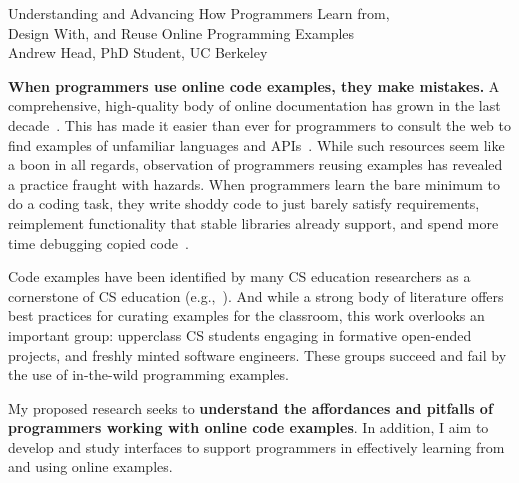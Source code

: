 \documentclass[12pt]{memoir}
\title{}
\author{Andrew Head}
\begin{document}
\begin{center}
Understanding and Advancing How Programmers Learn from,\\ Design With, and Reuse Online Programming Examples\\
\vspace{1ex}
Andrew Head, PhD Student, UC Berkeley
\end{center}
\vspace{-1em}


\textbf{When programmers use online code examples, they make mistakes.}
A comprehensive, high-quality body of online documentation has grown in the last decade~\cite{parnin_crowd_2012,mamykina_design_2011}.
This has made it easier than ever for programmers to consult the web to find examples of unfamiliar languages and APIs~\cite{brandt_two_2009}.
While such resources seem like a boon in all regards, observation of programmers reusing examples has revealed a practice fraught with hazards.
When programmers learn the bare minimum to do a coding task, they write shoddy code to just barely satisfy requirements, reimplement functionality that stable libraries already support, and spend more time debugging copied code~\cite{brandt_opportunistic_2008,brandt_two_2009}.

Code examples have been identified by many CS education researchers as a cornerstone of CS education (e.g.,~\cite{lahtinen_study_2005}).
And while a strong body of literature offers best practices for curating examples for the classroom, this work overlooks an important group:
upperclass CS students engaging in formative open-ended projects, and freshly minted software engineers.
These groups succeed and fail by the use of in-the-wild programming examples.


My proposed research seeks to \textbf{understand the affordances and pitfalls of programmers working with online code examples}.
In addition, I aim to develop and study interfaces to support programmers in effectively learning from and using online examples.
\end{document}
